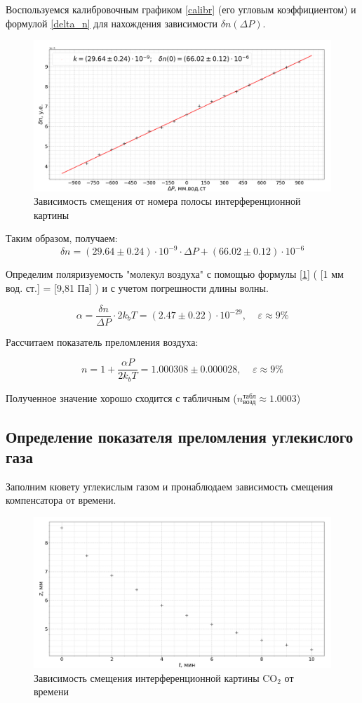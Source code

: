 Воспользуемся калибровочным графиком \ref{calibr} (его угловым коэффициентом) и формулой \ref{delta_n} для нахождения зависимости $\delta n (\Delta P)$.

\begin{figure}[h!]
		\includegraphics[width = 1.03\linewidth]{graph2.png}
		\caption{Зависимость смещения от номера полосы интерференционной картины}
\end{figure}

Таким образом, получаем:
$$\delta n = (29.64 \pm 0.24)\cdot10^{-9}\cdot\Delta P + (66.02\pm0.12)\cdot10^{-6}$$

Определим поляризуемость "молекул воздуха" с помощью формулы \ref{1} ( [1 мм вод. ст.] = [9,81 Па] ) и с учетом погрешности длины волны.

$$\alpha = \frac{\delta n}{\Delta P} \cdot 2k_bT = (2.47 \pm 0.22)\cdot 10^{-29}, \;\;\;\; \varepsilon \approx 9 \%  $$

Рассчитаем показатель преломления воздуха:

$$n = 1 + \frac{\alpha P}{2k_bT} = 1.000308 \pm 0.000028, \;\;\;\; \varepsilon \approx 9 \%$$

Полученное значение хорошо сходится с табличным ($n^\text{табл}_{возд} \approx 1.0003$)
\newpage
\subsection{Определение показателя преломления углекислого газа}

Заполним кювету углекислым газом и пронаблюдаем зависимость смещения компенсатора от времени.

\begin{figure}[h!]
		\includegraphics[width = 1.03\linewidth]{co2.png}
		\caption{Зависимость смещения интерференционной картины CO$_2$ от времени}
\end{figure}

